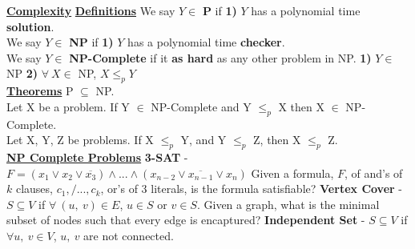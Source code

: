 \documentclass[10pt]{article}
\begin{document}
\begin{multicols*}{3}
\noindent \Large{\underline{\textbf{Complexity}}} \newline
\normalsize
\noindent \underline{\textbf{Definitions}} \newline
\noindent We say $Y \in$ \textbf{P} if \newline
\textbf{1)} $Y$ has a polynomial time \textbf{solution}. \newline \\
We say $Y \in$ \textbf{NP} if \newline
\textbf{1)} $Y$ has a polynomial time \textbf{checker}. \newline \\
We say $Y \in$ \textbf{NP-Complete} if it \textbf{as hard} as any other problem in NP.\newline
\textbf{1)} $Y \in$ NP \newline
\textbf{2)} $\forall\ X \in$ NP, $X \leq_p Y$ \newline \\
\underline{\textbf{Theorems}} \newline
P $\subseteq$ NP. \newline \\
Let X be a problem. \newline
If Y $\in$ NP-Complete and Y $\leq_p$ X \newline
then X $\in$ NP-Complete. \newline \\
Let X, Y, Z be problems. \newline
If X $\leq_p$ Y, and Y $\leq_p$ Z, \newline
then X $\leq_p$ Z. \newline \\
\noindent \Large{\underline{\textbf{NP Complete Problems}}} \newline
\normalsize
\noindent \textbf{3-SAT} - $F = (x_1 \vee x_2 \vee \overline{x_3}) \wedge ... \wedge (x_{n-2} \vee \overline{x_{n-1}} \vee x_n)$ \newline
Given a formula, $F$, of and's of $k$ clauses, $c_1,/ ..., c_k$, or's of 3 literals, is the formula satisfiable? \newline 
\textbf{Vertex Cover} - $S \subseteq V$ if $\forall\ (u,\ v) \in E$, $u \in S$ or $v \in S$. \newline
Given a graph, what is the minimal subset of nodes such that every edge is encaptured? \newline 
\textbf{Independent Set} - $S \subseteq V$ if $\forall u,\ v \in V$, $u,\ v$ are not connected. \newline

\end{multicols*}
\end{document}
